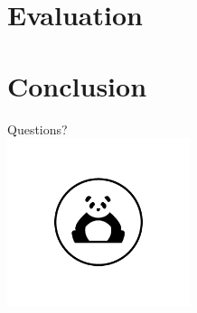 \documentclass[10pt]{beamer}
\begin{document}
\section{Evaluation}




\section{Conclusion}
% 


\begin{frame}
\centering\Huge
	Questions? \\
	\includegraphics[width=0.4\textwidth]{images/panda_logo.png}
\end{frame}
\end{document}
